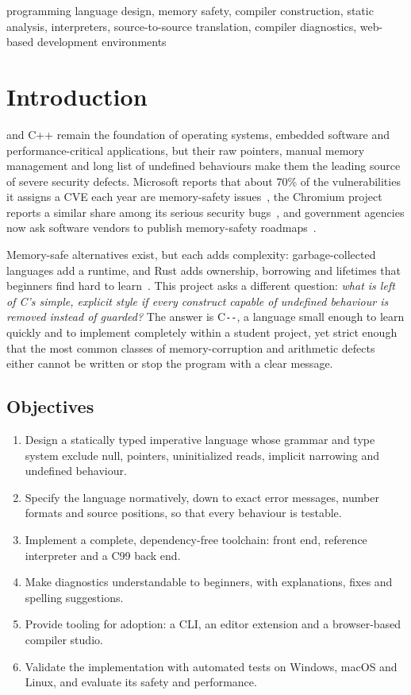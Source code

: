 \documentclass[conference]{IEEEtran}
\newcommand{\cmm}{C\texttt{-{}-}}
\begin{document}
\begin{IEEEkeywords}
programming language design, memory safety, compiler construction, static analysis, interpreters,
source-to-source translation, compiler diagnostics, web-based development environments
\end{IEEEkeywords}

\section{Introduction}
 and C++ remain the foundation of operating systems, embedded software and performance-critical
applications, but their raw pointers, manual memory management and long list of undefined behaviours make
them the leading source of severe security defects. Microsoft reports that about 70\% of the vulnerabilities
it assigns a CVE each year are memory-safety issues~\cite{miller2019}, the Chromium project reports a similar
share among its serious security bugs~\cite{chromium_memsafety}, and government agencies now ask software
vendors to publish memory-safety roadmaps~\cite{cisa2023}.

Memory-safe alternatives exist, but each adds complexity: garbage-collected languages add a runtime, and Rust
adds ownership, borrowing and lifetimes that beginners find hard to learn~\cite{rust}. This project asks a
different question: \emph{what is left of C's simple, explicit style if every construct capable of undefined
behaviour is removed instead of guarded?} The answer is \cmm{}, a language small enough to learn quickly and
to implement completely within a student project, yet strict enough that the most common classes of
memory-corruption and arithmetic defects either cannot be written or stop the program with a clear message.

\subsection{Objectives}
\begin{enumerate}
  \item Design a statically typed imperative language whose grammar and type system exclude null, pointers,
        uninitialized reads, implicit narrowing and undefined behaviour.
  \item Specify the language normatively, down to exact error messages, number formats and source positions,
        so that every behaviour is testable.
  \item Implement a complete, dependency-free toolchain: front end, reference interpreter and a C99 back end.
  \item Make diagnostics understandable to beginners, with explanations, fixes and spelling suggestions.
  \item Provide tooling for adoption: a CLI, an editor extension and a browser-based compiler studio.
  \item Validate the implementation with automated tests on Windows, macOS and Linux, and evaluate its
        safety and performance.
\end{enumerate}
\end{document}
